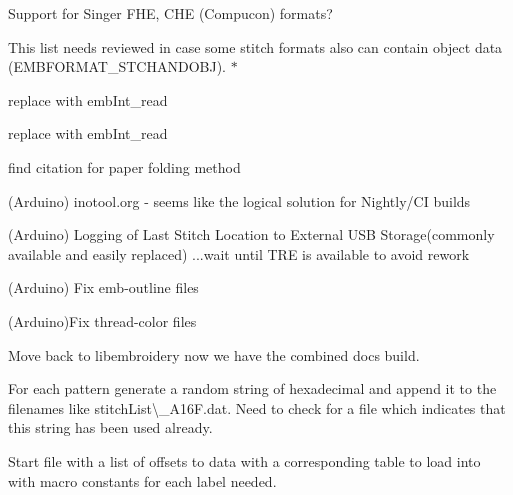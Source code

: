 \begin{DoxyRefList}
\label{todo__todo000185}%
%
Support for Singer FHE, CHE (Compucon) formats? 
\item[Member \mbox{\hyperlink{formats_8c_a8cb11404ce46501561f956d33f8dcf95}{format\+Table}} \mbox{[}number\+Of\+Formats\mbox{]}]\label{todo__todo000210}%
%
This list needs reviewed in case some stitch formats also can contain object data (EMBFORMAT\+\_\+\+STCHANDOBJ). $\ast$  
\item[Member \mbox{\hyperlink{formats_8c_a05fb50e7292226bc2947dd2b4da7a9bd}{fread\+\_\+int32\+\_\+be}} (FILE $\ast$f)]\label{todo__todo000212}%
%
replace with emb\+Int\+\_\+read  
\item[Member \mbox{\hyperlink{formats_8c_a2bcdb1e6bf6930d5c054ecdca9831eba}{fread\+\_\+uint16}} (FILE $\ast$f)]\label{todo__todo000211}%
%
replace with emb\+Int\+\_\+read  
\item[Member \mbox{\hyperlink{fill_8c_ad02b5d945eacff708d2bf084c40044d8}{generate\+\_\+dragon\+\_\+curve}} (char $\ast$state, int iterations)]\label{todo__todo000205}%
%
find citation for paper folding method  
\item[Page \mbox{\hyperlink{geometry-and-algorithms}{Geometry and Algorithms}} ]\label{todo__todo000189}%
%
(Arduino) inotool.\+org -\/ seems like the logical solution for Nightly/\+CI builds

\label{todo__todo000188}%
%
(Arduino) Logging of Last Stitch Location to External USB Storage(commonly available and easily replaced) ...wait until TRE is available to avoid rework

\label{todo__todo000186}%
%
(Arduino) Fix emb-\/outline files

\label{todo__todo000187}%
%
(Arduino)Fix thread-\/color files

\label{todo__todo000196}%
%
Move back to libembroidery now we have the combined docs build.

\label{todo__todo000195}%
%
For each pattern generate a random string of hexadecimal and append it to the filenames like {\ttfamily stitch\+List\textbackslash{}\+\_\+\+A16\+F.\+dat}. Need to check for a file which indicates that this string has been used already.

\label{todo__todo000194}%
%
Start file with a list of offsets to data with a corresponding table to load into with macro constants for each label needed.


\end{DoxyRefList}
